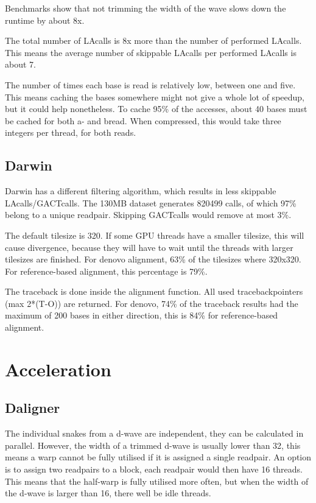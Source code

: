 \documentclass[../main/thesis.tex]{subfiles}
\begin{document}
Benchmarks show that not trimming the width of the wave slows down the runtime by about 8x.

The total number of LAcalls is 8x more than the number of performed LAcalls.
This means the average number of skippable LAcalls per performed LAcalls is about 7.

The number of times each base is read is relatively low, between one and five.
This means caching the bases somewhere might not give a whole lot of speedup, but it could help nonetheless.
To cache 95\% of the accesses, about 40 bases must be cached for both a- and bread.
When compressed, this would take three integers per thread, for both reads.

\subsection{Darwin}
Darwin has a different filtering algorithm, which results in less skippable LAcalls/GACTcalls.
The 130MB dataset generates 820499 calls, of which 97\% belong to a unique readpair.
Skipping GACTcalls would remove at most 3\%.


The default tilesize is 320.
If some GPU threads have a smaller tilesize, this will cause divergence, because they will have to wait until the threads with larger tilesizes are finished.
For denovo alignment, 63\% of the tilesizes where 320x320.
For reference-based alignment, this percentage is 79\%.

The traceback is done inside the alignment function.
All used tracebackpointers (max 2*(T-O)) are returned.
For denovo, 74\% of the traceback results had the maximum of 200 bases in either direction, this is 84\% for reference-based alignment.



\section{Acceleration}
\subsection{Daligner}
The individual snakes from a d-wave are independent, they can be calculated in parallel.
However, the width of a trimmed d-wave is usually lower than 32, this means a warp cannot be fully utilised if it is assigned a single readpair.
An option is to assign two readpairs to a block, each readpair would then have 16 threads.
This means that the half-warp is fully utilised more often, but when the width of the d-wave is larger than 16, there well be idle threads.
\end{document}
